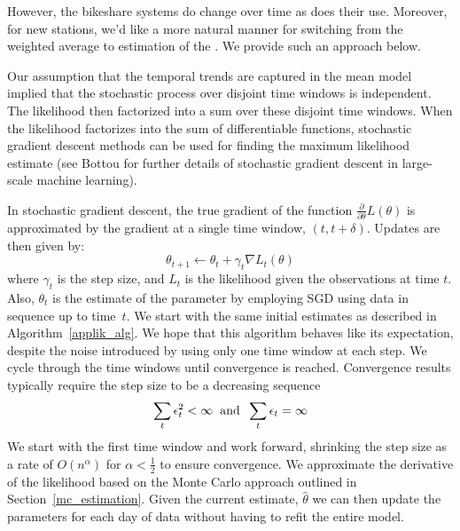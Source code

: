 \documentclass{acm_proc_article-sp}
\begin{document}
However, the bikeshare systems do change over time as does their use.  Moreover, for new stations, we'd like a more natural manner for switching from the weighted average to estimation of the .  We provide such an approach below.

Our assumption that the temporal trends are captured in the mean model implied that the stochastic process over disjoint time windows is independent.  The likelihood then factorized into a sum over these disjoint time windows.  When the likelihood factorizes into the sum of differentiable functions, stochastic gradient descent methods can be used for finding the maximum likelihood estimate (see Bottou \cite{bottou:sgd} for further details of stochastic gradient descent in large-scale machine learning).

In stochastic gradient descent, the true gradient of the function $\frac{\partial}{\partial \theta} L( \theta)$ is approximated by the gradient at a single time window, $(t, t+\delta)$.  Updates are then given by:
\begin{equation}
\theta_{t+1} \gets \theta_{t} + \gamma_t \nabla L_t (\theta) 
\end{equation}
\noindent where $\gamma_t$ is the step size, and $L_t$ is the likelihood given the observations at time $t$.  Also, $\theta_t$ is the estimate of the parameter by employing SGD using data in sequence up to time~$t$.  We start with the same initial estimates as described in Algorithm~\ref{applik_alg}.  We hope that this algorithm behaves like its expectation, despite the noise introduced by using only one time window at each step.  We cycle through the time windows until convergence is reached. Convergence results typically require the step size to be a decreasing sequence 
\begin{equation} \label{sgd_conditions}
\sum_{t} \epsilon_t^2 < \infty \hspace{0.2 cm} \text{and} \hspace{0.2cm} \sum_{t} \epsilon_t = \infty
\end{equation}
\noindent We start with the first time window and work forward, shrinking the step size as a rate of $O(n^{\alpha})$ for $\alpha < \frac{1}{2}$ to ensure convergence.  We approximate the derivative of the likelihood based on the Monte Carlo approach outlined in Section~\ref{mc_estimation}.  Given the current estimate, $\hat{\theta}$ we can then update the parameters for each day of data without having to refit the entire model.
\end{document}

